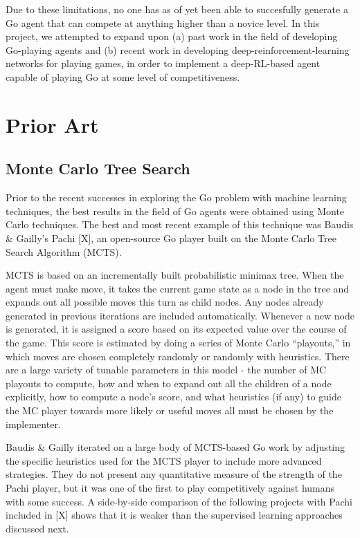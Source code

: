 Due to these limitations, no one has as of yet been able to succesfully generate a Go agent that can compete at anything higher than a novice level. In this project, we attempted to expand upon (a) past work in the field of developing Go-playing agents and (b) recent work in developing deep-reinforcement-learning networks for playing games, in order to implement a deep-RL-based agent capable of playing Go at some level of competitiveness.

\section{Prior Art}
\label{gen_inst}

\subsection{Monte Carlo Tree Search}
Prior to the recent successes in exploring the Go problem with machine learning techniques, the best results in the field of Go agents were obtained using Monte Carlo techniques. The best and most recent example of this technique was Baudis \& Gailly's Pachi [X], an open-source Go player built on the Monte Carlo Tree Search Algorithm (MCTS).

MCTS is based on an incrementally built probabilistic minimax tree. When the agent must make move, it takes the current game state as a node in the tree and expands out all possible moves this turn as child nodes. Any nodes already generated in previous iterations are included automatically. Whenever a new node is generated, it is assigned a score based on its expected value over the course of the game. This score is estimated by doing a series of Monte Carlo ``playouts,'' in which moves are chosen completely randomly or randomly with heuristics. There are a large variety of tunable parameters in this model - the number of MC playouts to compute, how and when to expand out all the children of a node explicitly, how to compute a node's score, and what heuristics (if any) to guide the MC player towards more likely or useful moves all must be chosen by the implementer.

Baudis \& Gailly iterated on a large body of MCTS-based Go work by adjusting the specific heuristics used for the MCTS player to include more advanced strategies. They do not present any quantitative measure of the strength of the Pachi player, but it was one of the first to play competitively against humans with some success. A side-by-side comparison of the following projects with Pachi included in [X] shows that it is weaker than the supervised learning approaches discussed next.

